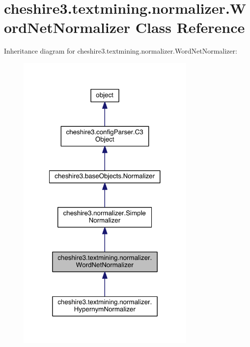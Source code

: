 \hypertarget{classcheshire3_1_1textmining_1_1normalizer_1_1_word_net_normalizer}{\section{cheshire3.\-textmining.\-normalizer.\-Word\-Net\-Normalizer Class Reference}
\label{classcheshire3_1_1textmining_1_1normalizer_1_1_word_net_normalizer}
}


Inheritance diagram for cheshire3.\-textmining.\-normalizer.\-Word\-Net\-Normalizer\-:
\nopagebreak
\begin{figure}[H]
\begin{center}
\leavevmode
\includegraphics[width=248pt]{classcheshire3_1_1textmining_1_1normalizer_1_1_word_net_normalizer__inherit__graph}
\end{center}
\end{figure}


